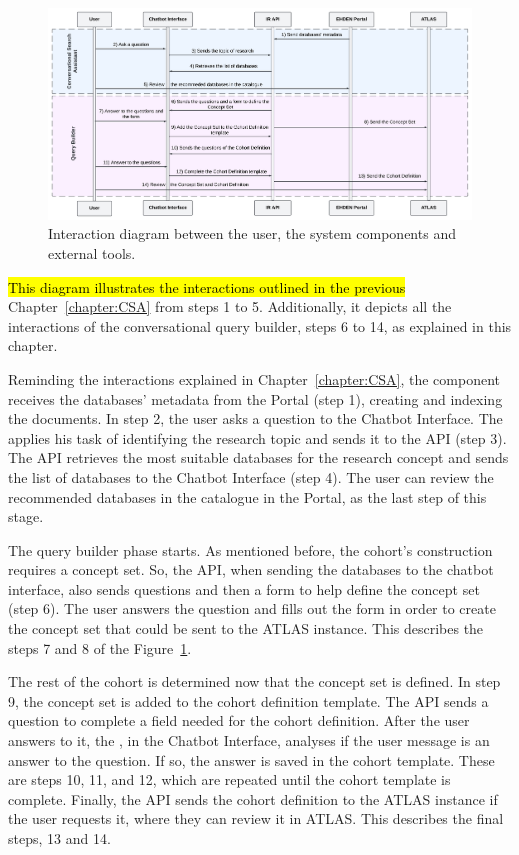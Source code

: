\begin{figure}[H]
  \includegraphics[width=\textwidth]{figs/chapter4/interaction_diagram2.png}
  \centering
  \caption[Interaction diagram between components]{Interaction diagram between the user, the system components and external tools.}
  \label{fig_interaction}
\end{figure}

\hl{This diagram illustrates the interactions outlined in the previous} Chapter~\ref{chapter:CSA} from steps 1 to 5. Additionally, it depicts all the interactions of the conversational query builder, steps 6 to 14, as explained in this chapter.

Reminding the interactions explained in Chapter~\ref{chapter:CSA}, the {\ir} component receives the databases' metadata from the {\ehden} Portal (step 1), creating and indexing the documents. In step 2, the user asks a question to the Chatbot Interface. The {\llm} applies his task of identifying the research topic and sends it to the {\ir} API (step 3). The {\ir} API retrieves the most suitable databases for the research concept and sends the list of databases to the Chatbot Interface (step 4). The user can review the recommended databases in the catalogue in the {\ehden} Portal, as the last step of this stage.

The query builder phase starts. As mentioned before, the cohort's construction requires a concept set. So, the {\ir} API, when sending the databases to the chatbot interface, also sends questions and then a form to help define the concept set (step 6). The user answers the question and fills out the form in order to create the concept set that could be sent to the ATLAS instance. This describes the steps 7 and 8 of the Figure~\ref{fig_interaction}. 

The rest of the cohort is determined now that the concept set is defined. In step 9, the concept set is added to the cohort definition template. The {\ir} API sends a question to complete a field needed for the cohort definition. After the user answers to it, the {\llm}, in the Chatbot Interface, analyses if the user message is an answer to the question. If so, the answer is saved in the cohort template. These are steps 10, 11, and 12, which are repeated until the cohort template is complete. Finally, the API sends the cohort definition to the ATLAS instance if the user requests it, where they can review it in ATLAS. This describes the final steps, 13 and 14. 


